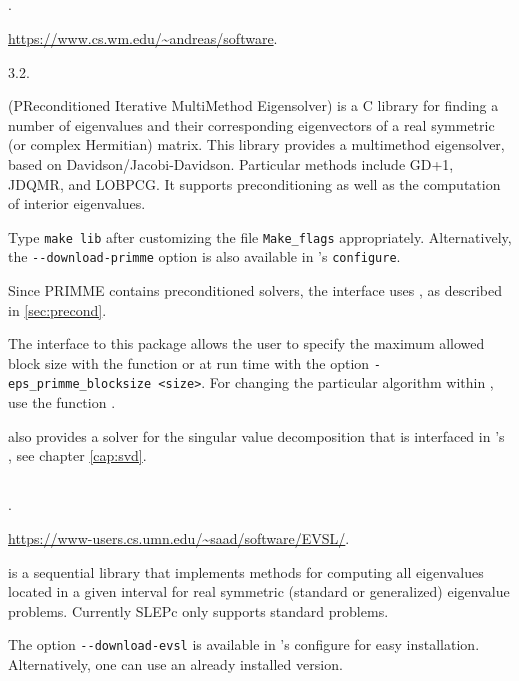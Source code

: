 \subsection*{\underline{\primme}}
\begin{description}
\setlength{\itemsep}{0pt}
\item[References.]\citep{Stathopoulos:2010:PMS}.
\item[Website.] \url{https://www.cs.wm.edu/~andreas/software}.
\item[Version.] 3.2.
\item[Summary.] \primme (PReconditioned Iterative MultiMethod Eigensolver) is a C library for finding a number of eigenvalues and their corresponding eigenvectors of a real symmetric (or complex Hermitian) matrix. This library provides a multimethod eigensolver, based on Davidson/Jacobi-Davidson. Particular methods include GD+1, JDQMR, and LOBPCG. It supports preconditioning as well as the computation of interior eigenvalues.
\item[Installation.] Type \texttt{make lib} after customizing the file \texttt{Make\_flags} appropriately. Alternatively, the \texttt{-{}-download-primme} option is also available in \slepc's \texttt{configure}.
\item[Specific options.] Since PRIMME contains preconditioned solvers, the \slepc interface uses , as described in \ref{sec:precond}.

The \slepc interface to this package allows the user to specify the maximum allowed block size with the function  or at run time with the option \Verb!-eps_primme_blocksize <size>!.
For changing the particular algorithm within \primme, use the function .

\primme also provides a solver for the singular value decomposition that is interfaced in \slepc's , see chapter \ref{cap:svd}.
\end{description}

\subsection*{\underline{\evsl}}
\begin{description}
\setlength{\itemsep}{0pt}
\item[References.]\citep{Li:2019:EVS}.
\item[Website.] \url{https://www-users.cs.umn.edu/~saad/software/EVSL/}.
\item[Summary.] \evsl is a sequential library that implements methods for computing all eigenvalues located in a given interval for real symmetric (standard or generalized) eigenvalue problems. Currently SLEPc only supports standard problems.
\item[Installation.] The option \texttt{-{}-download-evsl} is available in \slepc's configure for easy installation. Alternatively, one can use an already installed version.
\end{description}

